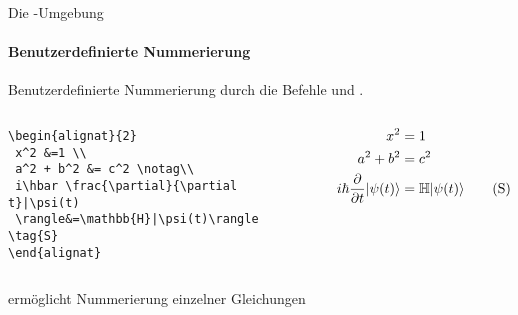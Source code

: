 \begin{frame}[fragile]{Die -Umgebung}
\framesubtitle{Benutzerdefinierte Nummerierung}
Benutzerdefinierte Nummerierung durch die Befehle  und .

\begin{columns}
\begin{column}{0.5\textwidth}
\begin{codeblock}
\begin{tiny}
\begin{verbatim}
\begin{alignat}{2}
 x^2 &=1 \\
 a^2 + b^2 &= c^2 \notag\\ 
 i\hbar \frac{\partial}{\partial t}|\psi(t)
 \rangle&=\mathbb{H}|\psi(t)\rangle \tag{S}
\end{alignat}
\end{verbatim}
\end{tiny}
\end{codeblock}
\end{column}
\begin{column}{0.45\textwidth}
\begin{alignat}{2}
 x^2 &=1 \\
 a^2 + b^2 &= c^2 \notag\\ 
 i\hbar \frac{\partial}{\partial t}|\psi(t)\rangle&=\mathbb{H}|\psi(t)\rangle \tag{S}
\end{alignat}
\end{column}
\end{columns}

\medskip\pause
{} ermöglicht Nummerierung einzelner Gleichungen
\end{frame}
